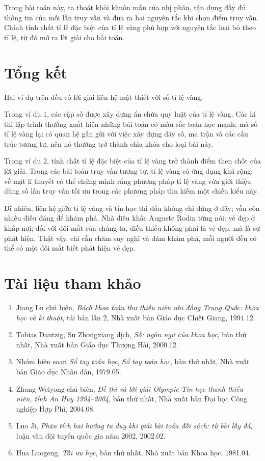 \documentclass[11pt]{article}
\begin{document}
Trong bài toán này, ta thoát khỏi khuôn mẫu của nhị phân, tận dụng đầy đủ
thông tin của mỗi lần truy vấn và đưa ra hai nguyên tắc khi chọn điểm truy
vấn. Chính tính chất tỉ lệ đặc biệt của tỉ lệ vàng phù hợp với nguyên tắc
loại bỏ theo tỉ lệ, từ đó mở ra lời giải cho bài toán.

\section{Tổng kết}

Hai ví dụ trên đều có lời giải liên hệ mật thiết với số tỉ lệ vàng.

Trong ví dụ 1, các cặp số được xây dựng ẩn chứa quy luật của tỉ lệ vàng. Các
kì thi lập trình thường xuất hiện những bài toán có màu sắc toán học mạnh; mà
số tỉ lệ vàng lại có quan hệ gần gũi với việc xây dựng dãy số, ma trận và các
cấu trúc tương tự, nên nó thường trở thành chìa khóa cho loại bài này.

Trong ví dụ 2, tính chất tỉ lệ đặc biệt của tỉ lệ vàng trở thành điểm then
chốt của lời giải. Trong các bài toán truy vấn tương tự, tỉ lệ vàng có ứng
dụng khá rộng; về mặt lí thuyết có thể chứng minh rằng phương pháp tỉ lệ vàng
vừa giới thiệu dùng số lần truy vấn tối ưu trong các phương pháp tìm kiếm một
chiều kiểu này.

Dĩ nhiên, liên hệ giữa tỉ lệ vàng và tin học thi đấu không chỉ dừng ở đây;
vẫn còn nhiều điều đáng để khám phá. Nhà điêu khắc Auguste Rodin từng nói:
vẻ đẹp ở khắp nơi; đối với đôi mắt của chúng ta, điều thiếu không phải là vẻ
đẹp, mà là sự phát hiện. Thật vậy, chỉ cần chăm suy nghĩ và dám khám phá, mỗi
người đều có thể có một đôi mắt biết phát hiện vẻ đẹp.

\section{Tài liệu tham khảo}

\begin{enumerate}
  \item Jiang Lu chủ biên, \textit{Bách khoa toàn thư thiếu niên nhi đồng
  Trung Quốc: khoa học và kĩ thuật}, tái bản lần 2, Nhà xuất bản Giáo dục
  Chiết Giang, 1994.12.
  \item Tobias Dantzig, Su Zhongxiang dịch, \textit{Số: ngôn ngữ của khoa
  học}, bản thứ nhất, Nhà xuất bản Giáo dục Thượng Hải, 2000.12.
  \item Nhóm biên soạn \textit{Sổ tay toán học}, \textit{Sổ tay toán học},
  bản thứ nhất, Nhà xuất bản Giáo dục Nhân dân, 1979.05.
  \item Zhang Weiyong chủ biên, \textit{Đề thi và lời giải Olympic Tin học
  thanh thiếu niên, tỉnh An Huy 1994--2004}, bản thứ nhất, Nhà xuất bản Đại
  học Công nghiệp Hợp Phì, 2004.08.
  \item Luo Ji, \textit{Phân tích hai hướng tư duy khi giải bài toán đối sách:
  từ bài lấy đá}, luận văn đội tuyển quốc gia năm 2002, 2002.02.
  \item Hua Luogeng, \textit{Tối ưu học}, bản thứ nhất, Nhà xuất bản Khoa học,
  1981.04.
\end{enumerate}
\end{document}
